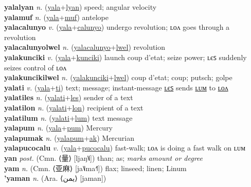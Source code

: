 \textbf{yalalyan} \textit{n.} (\hyperref[yala]{yala}+\hyperref[lyan]{lyan})
speed; angular velocity \label{yalalyan} \\
\textbf{yalamuf} \textit{n.} (\hyperref[yala]{yala}+\hyperref[muf]{muf})
antelope \label{yalamuf} \\
\textbf{yalacalunyo} \textit{v.} (\hyperref[yala]{yala}+\hyperref[calunyo]{calunyo})
undergo revolution; ʟᴏᴧ goes through a revolution \label{yalacalunyo} \\
\textbf{yalacalunyolwel} \textit{n.} (\hyperref[yalacalunyo]{yalacalunyo}+\hyperref[lwel]{lwel})
revolution \label{yalacalunyolwel} \\
\textbf{yalakunciki} \textit{v.} (\hyperref[yala]{yala}+\hyperref[kunciki]{kunciki})
launch coup d’etat; seize power; ʟєꜱ suddenly seizes control of ʟᴏᴧ \label{yalakunciki} \\
\textbf{yalakuncikilwel} \textit{n.} (\hyperref[yalakunciki]{yalakunciki}+\hyperref[lwel]{lwel})
coup d’etat; coup; putsch; golpe \label{yalakuncikilwel} \\
\textbf{yalati} \textit{v.} (\hyperref[yala]{yala}+\hyperref[ti]{ti})
text; message; instant-message \hyperref[yalatiles]{ʟєꜱ} sends \hyperref[yalatilum]{ʟᴜᴍ} to \hyperref[yalatilon]{ʟᴏᴧ} \label{yalati} \\
\textbf{yalatiles} \textit{n.} (\hyperref[yalati]{yalati}+\hyperref[les]{les})
sender of a text \label{yalatiles} \\
\textbf{yalatilon} \textit{n.} (\hyperref[yalati]{yalati}+\hyperref[lon]{lon})
recipient of a text \label{yalatilon} \\
\textbf{yalatilum} \textit{n.} (\hyperref[yalati]{yalati}+\hyperref[lum]{lum})
text message \label{yalatilum} \\
\textbf{yalapum} \textit{n.} (\hyperref[yala]{yala}+\hyperref[pum]{pum})
Mercury \label{yalapum} \\
\textbf{yalapumak} \textit{n.} (\hyperref[yalapum]{yalapum}+\hyperref[ak]{ak})
Mercurian \label{yalapumak} \\
\textbf{yalapucocalu} \textit{v.} (\hyperref[yala]{yala}+\hyperref[pucocalu]{pucocalu})
fast-walk; ʟᴏᴧ is doing a fast walk on ʟᴜᴍ \label{yalapucocalu} \\
\textbf{yan} \textit{post.} (Cmn. ⟨量⟩ [ljaŋ˥˩])
than; as; \textit{marks amount or degree} \label{yan} \\
\textbf{yam} \textit{n.} (Cmn. ⟨亚麻⟩ [ja˥˩ma˧˥])
flax; linseed; linen; Linum \label{yam} \\
\textbf{'yaman} \textit{n.} (Ara. ⟨يمن⟩ [jaman])
